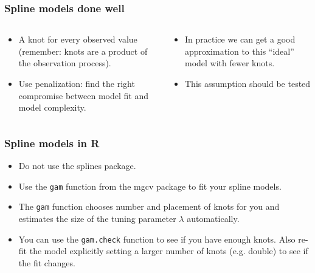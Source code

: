 \documentclass{beamer}
\begin{document}
\begin{frame}
  \frametitle{Spline models done well}

  \begin{columns}
    \begin{column}{5cm}
      \begin{itemize}
      \item A knot for every observed value (remember: knots are a
        product of the observation process).
      \item Use penalization: find the right compromise between model fit
        and model complexity.
      \end{itemize}
    \end{column}
    \begin{column}{5cm}
      \begin{itemize}
      \item In practice we can get a good approximation to this ``ideal''
        model with fewer knots.
      \item This assumption should be tested
      \end{itemize}
    \end{column}
  \end{columns}

\end{frame}

\begin{frame}
  \frametitle{Spline models in R}

  \begin{itemize}
  \item Do not use the \textsf{splines} package.
  \item Use the \texttt{gam} function from the \textsf{mgcv}
    package to fit your spline models.
  \item The \texttt{gam} function chooses number and placement of knots
    for you and estimates the size of the tuning parameter $\lambda$
    automatically.
  \item You can use the \texttt{gam.check} function to see if you have
    enough knots. Also re-fit the model explicitly setting a larger
    number of knots (e.g. double) to see if the fit changes.
  \end{itemize}

\end{frame}
\end{document}
